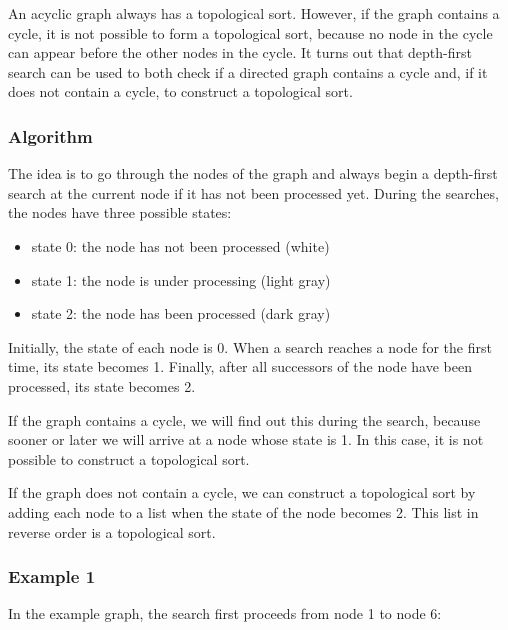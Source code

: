 An acyclic graph always has a topological sort.
However, if the graph contains a cycle,
it is not possible to form a topological sort,
because no node in the cycle can appear
before the other nodes in the cycle.
It turns out that depth-first search can be used
to both check if a directed graph contains a cycle
and, if it does not contain a cycle, to construct a topological sort.

\subsubsection{Algorithm}

The idea is to go through the nodes of the graph
and always begin a depth-first search at the current node
if it has not been processed yet.
During the searches, the nodes have three possible states:

\begin{itemize}
\item state 0: the node has not been processed (white)
\item state 1: the node is under processing (light gray)
\item state 2: the node has been processed (dark gray)
\end{itemize}

Initially, the state of each node is 0.
When a search reaches a node for the first time,
its state becomes 1.
Finally, after all successors of the node have
been processed, its state becomes 2.

If the graph contains a cycle, we will find out this
during the search, because sooner or later
we will arrive at a node whose state is 1.
In this case, it is not possible to construct a topological sort.

If the graph does not contain a cycle, we can construct
a topological sort by 
adding each node to a list when the state of the node becomes 2.
This list in reverse order is a topological sort.

\subsubsection{Example 1}

In the example graph, the search first proceeds
from node 1 to node 6:

\begin{center}
\end{center}

